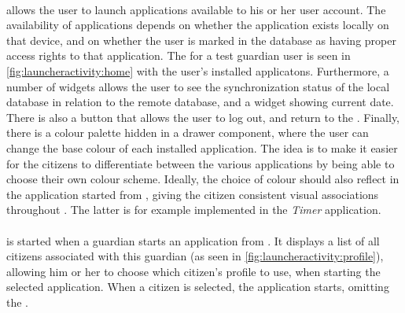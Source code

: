 \paragraph{\homeactivity} allows the user to launch \giraf applications available to his or her user account. 
The availability of applications depends on whether the application exists locally on that device, and on whether the user is marked in the database as having proper access rights to that application.
The \homeactivity for a test guardian user is seen in \cref{fig:launcheractivity:home} with the user's installed \giraf applicatons.
Furthermore, a number of widgets allows the user to see the synchronization status of the local database in relation to the remote database, and a widget showing current date. 
There is also a button that allows the user to log out, and return to the \authenticationactivity.
Finally, there is a colour palette hidden in a drawer component, where the user can change the base colour of each installed application. 
The idea is to make it easier for the citizens to differentiate between the various applications by being able to choose their own colour scheme. 
Ideally, the choice of colour should also reflect in the application started from \launcher, giving the citizen consistent visual associations throughout \giraf.
The latter is for example implemented in the \textit{Timer} application.

\paragraph{\profileselectionactivity} is started when a guardian starts an application from \launcher. 
It displays a list of all citizens associated with this guardian (as seen in \cref{fig:launcheractivity:profile}), allowing him or her to choose which citizen's profile to use, when starting the selected application. 
When a citizen is selected, the application starts, omitting the \profileselectionactivity.
